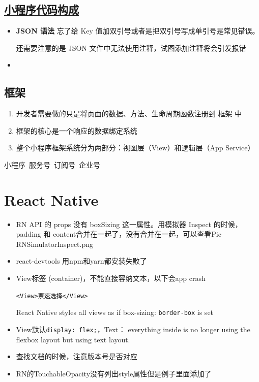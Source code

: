 \documentclass[a4paper, 12pt]{article}
\begin{document}
\subsection{\href{https://developers.weixin.qq.com/miniprogram/dev/framework/quickstart/code.html}{小程序代码构成}}
\begin{itemize}
\item \textbf{JSON 语法} 忘了给 Key 值加双引号或者是把双引号写成单引号是常见错误。

还需要注意的是 JSON 文件中无法使用注释，试图添加注释将会引发报错

\item 

\end{itemize}

\subsection{框架}
\begin{enumerate}

\item 开发者需要做的只是将页面的数据、方法、生命周期函数注册到 框架 中

\item 框架的核心是一个响应的数据绑定系统
\item 整个小程序框架系统分为两部分：视图层（View）和逻辑层（App Service）
\end{enumerate}

\vspace{2in}
小程序~服务号~订阅号~企业号


\section{React Native}
\begin{itemize}
\item RN API 的 props 没有 boxSizing 这一属性。用模拟器 Inspect 的时候，padding 和 content合并在一起了，没有合并在一起，可以查看Pic RNSimulatorInspect.png

\item react-devtools 用npm和yarn都安装失败了

\item View标签 (container)，不能直接容纳文本，以下会app crash

\verb|<View>票速选择</View>|

React Native styles all views as if box-sizing: \verb|border-box| is set

\item View默认\verb|display: flex;|，Text： everything inside is no longer using the flexbox layout but using text layout.

\item 查找文档的时候，注意版本号是否对应

\item RN的TouchableOpacity没有列出style属性但是例子里面添加了
\end{itemize}
\end{document}
